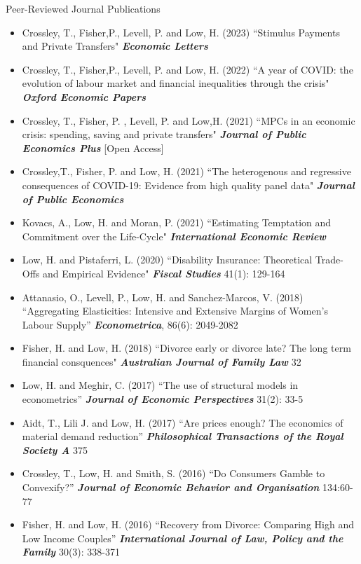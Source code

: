 \documentclass{resume} %
\begin{document}
\begin{rSection}{Peer-Reviewed Journal Publications}
\begin{itemize}
\item Crossley, T., Fisher,P., Levell, P. and Low, H. (2023) ``Stimulus Payments and Private Transfers"  \textit{\textbf{Economic Letters}} 
\item Crossley, T., Fisher,P., Levell, P. and Low, H. (2022) ``A year of COVID: the evolution of labour market and financial inequalities through the crisis"  \textit{\textbf{Oxford Economic Papers}}
\item Crossley, T., Fisher, P. , Levell, P. and Low,H. (2021)  ``MPCs in an economic crisis: spending, saving and private transfers" \textit{\textbf{Journal of Public Economics Plus}} [Open Access] 
\item Crossley,T., Fisher, P. and Low, H. (2021) ``The heterogenous and regressive consequences of COVID-19: Evidence from high quality panel data" \textit{\textbf{Journal of Public Economics}} 
\item Kovacs, A., Low, H. and Moran, P. (2021) ``Estimating Temptation and Commitment over the Life-Cycle"  \textit{\textbf{International Economic Review}}
\item Low, H. and Pistaferri, L. (2020) ``Disability Insurance: Theoretical Trade-Offs and Empirical Evidence" \textit{\textbf{Fiscal Studies}} 41(1): 129-164

\item Attanasio, O., Levell, P., Low, H. and Sanchez-Marcos, V. (2018) ``Aggregating Elasticities: Intensive and Extensive Margins of Women's Labour Supply” \textit{\textbf{Econometrica}}, 86(6): 2049-2082

\item Fisher, H. and Low, H. (2018) ``Divorce early or divorce late? The long term financial consquences" \textit{\textbf{Australian Journal of Family Law}} 32

\item Low, H. and Meghir, C. (2017) ``The use of structural models in econometrics” \textit{\textbf{Journal of Economic Perspectives}} 31(2): 33-5
\item Aidt, T., Lili J. and Low, H. (2017) ``Are prices enough? The economics of material demand reduction” \textit{\textbf{Philosophical Transactions of the Royal Society A}} 375
\item Crossley, T., Low, H. and Smith, S. (2016) ``Do Consumers Gamble to Convexify?” \textit{\textbf{Journal of Economic Behavior and Organisation}} 134:60-77
\item Fisher, H. and Low, H. (2016) ``Recovery from Divorce: Comparing High and Low Income Couples” \textit{\textbf{International Journal of Law, Policy and the Family}} 30(3): 338-371


\end{itemize}
\end{rSection}
\end{document}
